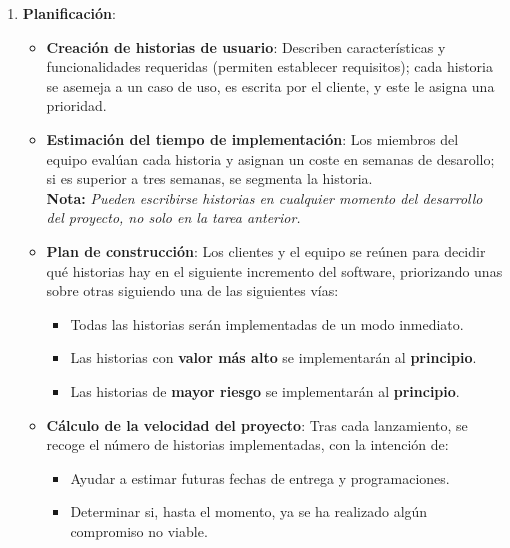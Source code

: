 \begin{enumerate}

   \item \textbf{Planificación}:
         
      \begin{itemize}
            \item \textbf{Creación de historias de usuario}: Describen características y funcionalidades requeridas (permiten establecer requisitos); cada historia se asemeja a un caso de uso, es escrita por el cliente, y este le asigna una prioridad.
            \item \textbf{Estimación del tiempo de implementación}: Los miembros del equipo evalúan cada historia y asignan un coste en semanas de desarollo; si es superior a tres semanas, se segmenta la historia.\\
            
            \textbf{Nota:} \textit{Pueden escribirse historias en cualquier momento del desarrollo del proyecto, no solo en la tarea anterior.}
            \item \textbf{Plan de construcción}: Los clientes y el equipo se reúnen para decidir qué historias hay en el siguiente incremento del software, priorizando unas sobre otras siguiendo una de las siguientes vías:
                  \begin{itemize}
                     \item Todas las historias serán implementadas de un modo inmediato.
                     \item Las historias con \textbf{valor más alto} se implementarán al \textbf{principio}.
                     \item Las historias de \textbf{mayor riesgo} se implementarán al \textbf{principio}.
                  \end{itemize}
            \item \textbf{Cálculo de la velocidad del proyecto}: Tras cada lanzamiento, se recoge el número de historias implementadas, con la intención de:
                  \begin{itemize}
                     \item Ayudar a estimar futuras fechas de entrega y programaciones.
                     \item Determinar si, hasta el momento, ya se ha realizado algún compromiso no viable.
                  \end{itemize}
         \end{itemize}



\end{enumerate}
